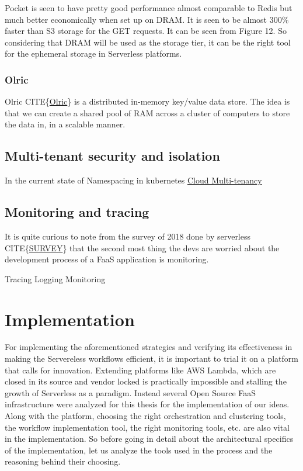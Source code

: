 \documentclass[12pt,titlepage]{article}
\begin{document}
Pocket is seen to have pretty good performance almost comparable to Redis but
much better economically when set up on DRAM. It is seen to be almost 300\%
faster than S3 storage for the GET requests. It can be seen from Figure 12.
So considering that DRAM will be used as the storage tier, it can be the
right tool for the ephemeral storage in Serverless platforms. 

\subsubsection{Olric}
\label{sec:orgc2d69a8}
Olric CITE\{\href{https://github.com/buraksezer/olric}{Olric}\} is a distributed in-memory key/value data store. The idea is
that we can create a shared pool of RAM across a cluster of computers to store
the data in, in a scalable manner.

\subsection{Multi-tenant security and isolation}
\label{sec:orgbb849b4}
In the current state of 
Namespacing in kubernetes
\href{https://www.researchgate.net/publication/321637564\_Cloud\_Multi-Tenancy\_Issues\_and\_Developments}{Cloud Multi-tenancy}

\subsection{Monitoring and tracing}
\label{sec:org59c4c40}
It is quite curious to note from the survey of 2018 done by serverless CITE\{\href{https://www.serverless.com/blog/2018-serverless-community-survey-huge-growth-usage}{SURVEY}\} that the
second most thing the devs are worried about the development process of a FaaS
application is monitoring.

Tracing
Logging
Monitoring


\section{Implementation}
\label{sec:orgb587d26}
For implementing the aforementioned strategies and verifying its effectiveness
in making the Servereless workflows efficient, it is important to trial it on a
platform that calls for innovation. Extending platforms like AWS Lambda, which
are closed in its source and vendor locked is practically impossible and
stalling the growth of Serverless as a paradigm. Instead several Open Source
FaaS infrastructure were analyzed for this thesis for the implementation of our
ideas. Along with the platform, choosing the right orchestration and clustering tools, the
workflow implementation tool, the right monitoring tools, etc. are also vital in
the implementation. So before going in detail about the architectural specifics
of the implementation, let us analyze the tools used in the process and the
reasoning behind their choosing.
\end{document}
